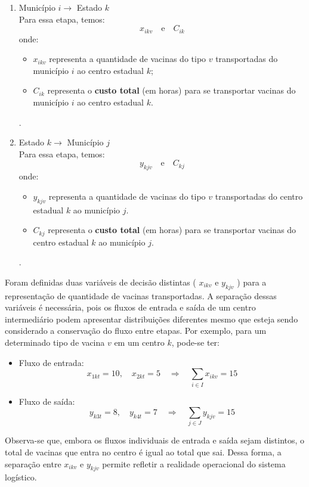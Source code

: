 \begin{enumerate}
    \item Município $i \longrightarrow$ Estado $k$ \\
    Para essa etapa, temos:
    \[ x_{ikv} \quad \text{e} \quad C_{ik}\]
    onde:
    \begin{itemize}
    \item $x_{ikv}$ representa a quantidade de vacinas do tipo $v$ transportadas do município $i$ ao centro estadual $k$;
    \item $C_{ik}$ representa o \textbf{custo total} (em horas) para se transportar vacinas do município $i$ ao centro estadual $k$.
    \end{itemize}.
    
    \item Estado $k \longrightarrow$ Município $j$ \\
    Para essa etapa, temos:
    \[y_{kjv} \quad \text{e} \quad C_{kj}\]
    onde:
     \begin{itemize}
    \item $y_{kjv}$ representa a quantidade de vacinas do tipo $v$ transportadas do centro estadual $k$ ao município $j$.
    \item $C_{kj}$ representa o \textbf{custo total} (em horas) para se transportar vacinas do centro estadual $k$ ao município $j$.
    \end{itemize}.
\end{enumerate}

Foram definidas duas variáveis de decisão distintas ( $x_{ikv}$ e $y_{kjv}$ ) para a representação de quantidade de vacinas transportadas.
A separação dessas variáveis é necessária, pois os fluxos de entrada e saída de um centro intermediário podem apresentar distribuições diferentes mesmo que esteja sendo considerado a conservação do fluxo entre etapas. Por exemplo, para um determinado tipo de vacina $v$ em um centro $k$, pode-se ter:

\begin{itemize}
\item Fluxo de entrada:
\[
x_{1kt} = 10, \quad x_{2kt} = 5 \quad \Rightarrow \quad \sum_{i \in I} x_{ikv} = 15
\]

\item Fluxo de saída:
\[
y_{k3t} = 8, \quad y_{k4t} = 7 \quad \Rightarrow \quad \sum_{j \in J} y_{kjv} = 15
\]
\end{itemize}

Observa-se que, embora os fluxos individuais de entrada e saída sejam distintos, o total de vacinas que entra no centro é igual ao total que sai. Dessa forma, a separação entre $x_{ikv}$ e $y_{kjv}$ permite refletir a realidade operacional do sistema logístico.


